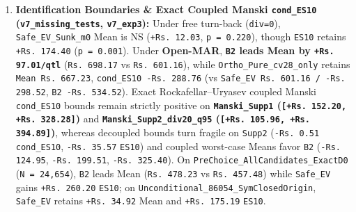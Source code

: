 \documentclass[11pt,a4paper]{article}
\begin{document}
\begin{enumerate}
  \item \textbf{Identification Boundaries \& Exact Coupled Manski \texttt{cond\_ES10} (\texttt{v7\_missing\_tests}, \texttt{v7\_exp3}):} Under free turn-back (\texttt{div=0}), \texttt{Safe\_EV\_Sunk\_m0} Mean is NS (\texttt{+Rs.\,12.03}, \texttt{p = 0.220}), though \texttt{ES10} retains \texttt{+Rs.\,174.40} (\texttt{p = 0.001}). Under \textbf{Open-MAR}, \textbf{\texttt{B2} leads Mean by \texttt{+Rs.\,97.01/qtl}} (\texttt{Rs.\,698.17} vs \texttt{Rs.\,601.16}), while \texttt{Ortho\_Pure\_cv28\_only} retains \texttt{Mean Rs.\,667.23}, \texttt{cond\_ES10 -Rs.\,288.76} (vs \texttt{Safe\_EV Rs.\,601.16 / -Rs.\,298.52}, \texttt{B2 -Rs.\,534.52}). Exact Rockafellar--Uryasev coupled Manski \texttt{cond\_ES10} bounds remain strictly positive on \textbf{\texttt{Manski\_Supp1} (\texttt{[+Rs.\,152.20, +Rs.\,328.28]})} and \textbf{\texttt{Manski\_Supp2\_div20\_q95} (\texttt{[+Rs.\,105.96, +Rs.\,394.89]})}, whereas decoupled bounds turn fragile on \texttt{Supp2} (\texttt{-Rs.\,0.51} \texttt{cond\_ES10}, \texttt{-Rs.\,35.57} \texttt{ES10}) and coupled worst-case Means favor \texttt{B2} (\texttt{-Rs.\,124.95}, \texttt{-Rs.\,199.51}, \texttt{-Rs.\,325.40}). On \texttt{PreChoice\_AllCandidates\_ExactD0} (\texttt{N = 24,654}), \texttt{B2} leads Mean (\texttt{Rs.\,478.23} vs \texttt{Rs.\,457.48}) while \texttt{Safe\_EV} gains \texttt{+Rs.\,260.20} \texttt{ES10}; on \texttt{Unconditional\_86054\_SymClosedOrigin}, \texttt{Safe\_EV} retains \texttt{+Rs.\,34.92} Mean and \texttt{+Rs.\,175.19} \texttt{ES10}.

\end{enumerate}
\end{document}
